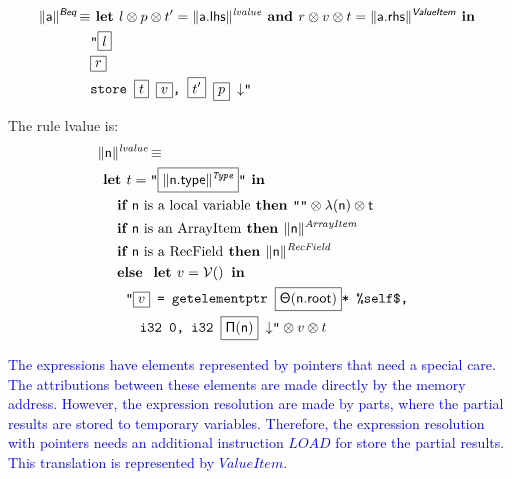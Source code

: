 \documentclass{llncs}
\newcommand{\trad}[2]{\ensuremath{\lVert \textsf{#1} \rVert^{\textit{#2}}}}
\newcommand{\nl}[0]{\ensuremath{\downarrow}}
\DeclareMathOperator{\isdef}{\equiv}
\DeclareMathOperator{\variable}{\mathcal{V}()}
\newcommand{\llvm}[1]{\texttt{#1}}
\newcommand{\B}[1]{\textsf{#1}}
\newcommand{\IF}[0]{\textbf{ if }}
\newcommand{\ELSE}[0]{\textbf{ else }}
\newcommand{\THEN}[0]{\textbf{ then }}
\newcommand{\LET}[0]{\textbf{ let }}
\newcommand{\IN}[0]{\textbf{ in }}
\newcommand{\AND}[0]{\textbf{ and }}
\newcommand{\PH}[1]{\framebox{$#1$}}
\newcommand{\sep}[0]{\otimes}
\newcommand{\local}[0]{\ensuremath{\sf\lambda}}
\newcommand{\idx}[0]{\ensuremath{\sf\Pi}}
\newcommand{\state}[0]{\ensuremath{\sf\Theta}}
\begin{document}
\begin{align*}
\begin{split}
  \trad{a}{\B{Beq}} \isdef
  & \LET l \sep p \sep t'= \trad{a.lhs}{lvalue} \AND r \sep v \sep t = \trad{a.rhs}{\B{ValueItem}} \IN \\
  & \llvm{"\PH{l}} \\
  & \llvm{\PH{r}} \\
  & \llvm{store \PH{t} \PH{v}, \PH{t'} \PH{p} \nl"}
\end{split}
\end{align*}

The rule lvalue is:
\begin{align*}
\lefteqn{\trad{n}{lvalue} \isdef} \\
& \LET t = \llvm{"\PH{\trad{\B{n.type}}{Type}}"} \IN \\
& \quad \IF \mbox{\B{n} is a local variable} \THEN \llvm{""} \sep \local(\B{n}) \sep t \\
& \quad \IF \mbox{\B{n} is an ArrayItem} \THEN  \trad{n}{ArrayItem} \\
& \quad \IF \mbox{\B{n} is a RecField} \THEN  \trad{n}{RecField} \\
& \quad \ELSE \LET v = \variable \IN \\
& \quad \quad \llvm{"\PH{v} = getelementptr \PH{\state(\B{n.root})}* \%self\$,} \\
& \quad \quad \quad \llvm{i32 0, i32 \PH{\idx(\B{n})} \nl"} \sep v \sep t
\end{align*}

\textcolor{blue}{The expressions have elements represented by pointers that need a special 
care. The attributions between these elements are made  directly by the memory 
address.  However, the expression resolution are made by parts, where the 
partial results are stored to temporary variables. Therefore, the expression 
resolution with pointers needs an additional instruction $LOAD$ for store the 
partial results. This translation is represented by $ValueItem$.} 
\end{document}
